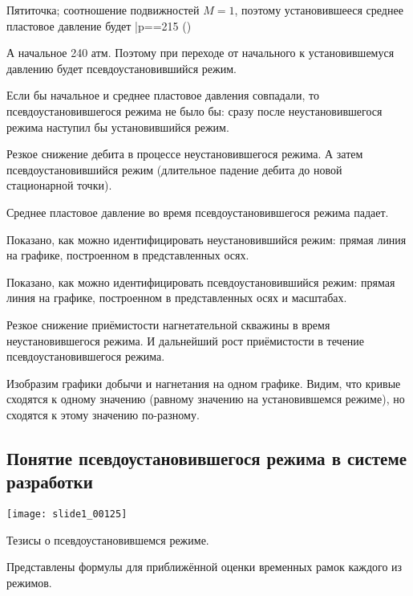 \documentclass[main.tex]{subfiles}
\begin{document}
Пятиточка; соотношение подвижностей $M=1$, поэтому установившееся среднее пластовое давление будет
\beq
\bar{p}==215 ()
\eeq

А начальное 240 атм. Поэтому при переходе от начального к установившемуся давлению будет псевдоустановившийся режим.

Если бы начальное и среднее пластовое давления совпадали, то псевдоустановившегося режима не было бы: сразу после неустановившегося режима наступил бы установившийся режим.


Резкое снижение дебита в процессе неустановившегося режима. А затем псевдоустановившийся режим (длительное падение дебита до новой стационарной точки). 


Среднее пластовое давление во время псевдоустановившегося режима падает.


Показано, как можно идентифицировать неустановившийся режим: прямая линия  на графике, построенном в представленных осях.


Показано, как можно идентифицировать псевдоустановившийся режим: прямая линия  на графике, построенном в представленных осях и масштабах.


Резкое снижение приёмистости нагнетательной скважины в время неустановившегося режима. И дальнейший рост приёмистости в течение псевдоустановившегося режима. 


Изобразим графики добычи и нагнетания на одном графике. Видим, что кривые сходятся к одному значению (равному значению на установившемся режиме), но сходятся к этому значению по-разному.

\subsection{Понятие псевдоустановившегося режима в системе разработки}

\texttt{[image: slide1\_00125]}

Тезисы о псевдоустановившемся режиме.

Представлены формулы для приближённой оценки временных рамок каждого из режимов.
\end{document}
